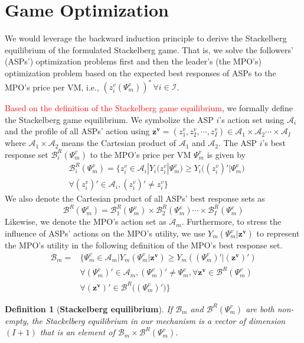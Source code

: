 \documentclass[10pt,journal, compsoc]{IEEEtran}
\newtheorem{definition}{Definition}
\begin{document}
\section{Game Optimization} \label{sec:game_optimization}
We would leverage the backward induction principle to derive the Stackelberg equilibrium of the formulated Stackelberg game. That is, we solve the followers' (ASPs') optimization problems first and then the leader's (the MPO's) optimization problem based on the expected best responses of ASPs to the MPO's price per VM, i.e., $(z_i^v(\Psi_m^v))^* \, \forall i \in \mathcal{I}$. 

\textcolor{red}{Based on the definition of the Stackelberg game equilibrium\cite{bacsar1998dynamic}}, we formally define the Stackelberg game equilibrium. We symbolize the ASP $i$'s action set using $\mathcal{A}_i$ and the profile of all ASPs' action using $\bm{z^v}=(z_1^v, z_2^v, \cdots, z_I^v) \in \mathcal{A}_1 \times \mathcal{A}_2 \cdots \times \mathcal{A}_I$ where $\mathcal{A}_1 \times \mathcal{A}_2$ means the Cartesian product of $\mathcal{A}_1$ and $\mathcal{A}_2$. The ASP $i$'s best response set $\mathcal{B}_i^R(\Psi_m^v)$ to the MPO's price per VM $\Psi_m^v$ is given by
\begin{equation} \label{eqn:asp_best_response}
\begin{aligned}
&\mathcal{B}_i^R(\Psi_m^v) = \{z_i^v \in \mathcal{A}_i |Y_i(z_i^v|\Psi_m^v) \geq Y_i\big((z_i^v)'|\Psi_m^v\big) \\
&\forall (z_i^v)' \in \mathcal{A}_i, (z_i^v)' \neq z_i^v\}
\end{aligned}
\end{equation}
We also denote the Cartesian product of all ASPs' best response sets as
\begin{equation}
\mathcal{B}^R(\Psi_m^v) = \mathcal{B}_1^R(\Psi_m^v) \times \mathcal{B}_2^R(\Psi_m^v) \cdots \times \mathcal{B}_I^R(\Psi_m^v)
\end{equation}
Likewise, we denote the MPO's action set as $\mathcal{A}_m$. Furthermore, to stress the influence of ASPs' actions on the MPO's utility, we use $Y_m(\Psi_m^v|\bm{z^v})$ to represent the MPO's utility in the following definition of the MPO's best response set.
\begin{equation} \label{eqn:mpo_best_response}
\begin{aligned}
\mathcal{B}_m = &\{\Psi_m^v \in \mathcal{A}_m| Y_m(\Psi_m^v|\bm{z^v}) \geq Y_m((\Psi_m^v)'|(\bm{z^v})') \\
&\forall (\Psi_m^v)' \in \mathcal{A}_m, (\Psi_m^v)' \neq \Psi_m^v, \forall \bm{z^v} \in \mathcal{B}^R(\Psi_m^v) \\
&\forall  (\bm{z^v})' \in \mathcal{B}^R\big((\Psi_m^v)'\big)\}
\end{aligned}
\end{equation}
\begin{definition}[\textbf{Stackelberg equilibrium}] \label{def:stackelberg_equilibrium}
If $\mathcal{B}_{m}$ and $\mathcal{B}^R(\Psi_m^v)$ are both non-empty, the Stackelberg equilibrium in our mechanism is a vector of dimension $(I+1)$ that is an element of $\mathcal{B}_m  \times \mathcal{B}^R(\Psi_m^v)$.
\end{definition}
\end{document}
